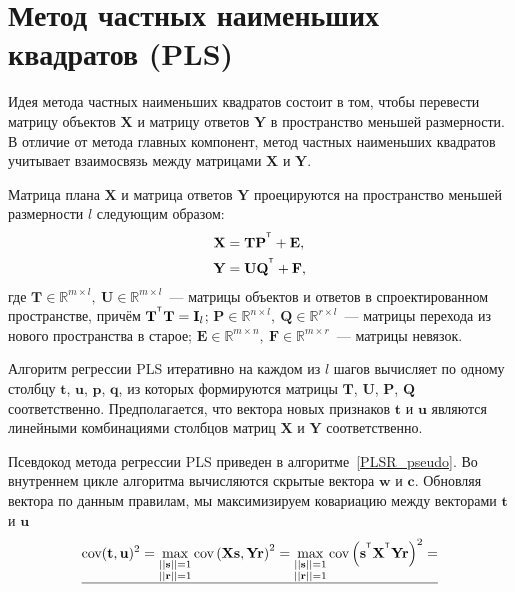 \documentclass[12pt,twoside]{article}
\newcommand{\bw}{\mathbf{w}}
\newcommand{\bY}{\mathbf{Y}}
\newcommand{\bX}{\mathbf{X}}
\newcommand{\bu}{\mathbf{u}}
\newcommand{\bt}{\mathbf{t}}
\newcommand{\bp}{\mathbf{p}}
\newcommand{\bq}{\mathbf{q}}
\newcommand{\br}{\mathbf{r}}
\newcommand{\bc}{\mathbf{c}}
\newcommand{\bs}{\mathbf{s}}
\newcommand{\bP}{\mathbf{P}}
\newcommand{\bT}{\mathbf{T}}
\newcommand{\bQ}{\mathbf{Q}}
\newcommand{\bE}{\mathbf{E}}
\newcommand{\bF}{\mathbf{F}}
\newcommand{\bU}{\mathbf{U}}
\newcommand{\bI}{\mathbf{I}}
\begin{document}
\newpage
\section{Метод частных наименьших квадратов (PLS)}

Идея метода частных наименьших квадратов состоит в том, чтобы перевести матрицу объектов $\bX$ и матрицу ответов $\bY$ в пространство меньшей размерности. В отличие от метода главных компонент, метод частных наименьших квадратов учитывает взаимосвязь между матрицами $\bX$ и $\bY$.

Матрица плана $\bX$ и матрица ответов $\bY$ проецируются на пространство меньшей размерности $l$ следующим образом:
\begin{align*}
\label{pls_x_y}
    \bX &= \bT \bP^{\T} + \bE,\\
    \bY &= \bU \bQ^{\T} + \bF,
\end{align*}
где $\bT \in \mathbb{R}^{m \times l},\ \bU \in \mathbb{R}^{m \times l}$~--- матрицы объектов и ответов в спроектированном пространстве, причём $\bT^{\T} \bT = \bI_{l}$; $\bP \in \mathbb{R}^{n \times l},\ \bQ \in \mathbb{R}^{r \times l}$~--- матрицы перехода из нового пространства в старое; $\bE\in \mathbb{R}^{m \times n},\ \bF \in \mathbb{R}^{m \times r}$~--- матрицы невязок. 

Алгоритм регрессии PLS итеративно на каждом из $l$ шагов вычисляет по одному столбцу $\bt$, $\bu$, $\bp$, $\bq$, из которых формируются матрицы $\bT$, $\bU$, $\bP$, $\bQ$ соответственно. Предполагается, что вектора новых признаков $\bt$ и $\bu$ являются линейными комбинациями столбцов матриц $\bX$ и $\bY$ соответственно.

Псевдокод метода регрессии PLS приведен в алгоритме~\ref{PLSR_pseudo}. Во внутреннем цикле алгоритма вычисляются скрытые вектора $\bw$ и $\bc$. Обновляя вектора по данным правилам, мы максимизируем ковариацию между векторами $\bt$ и $\bu$
\begin{align*}
	\text{cov} (\bt, \bu)^2 = \max_{\substack{||\bs||=1 \\ ||\br|| = 1}} \text{cov} \left( \bX \bs, \bY \br \right)^2 = \max_{\substack{||\bs||=1 \\ ||\br|| = 1}} \text{cov} \left( \bs^{\T} \bX^{\T} \bY \br \right)^2 = \\
	\hline
\end{align*}
\end{document}
